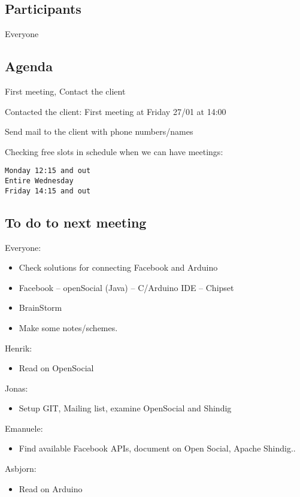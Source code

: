 \subsection{Participants}
 Everyone

\subsection{Agenda}
First meeting, Contact the client

Contacted the client: First meeting at Friday 27/01 at 14:00

Send mail to the client with phone numbers/names

Checking free slots in schedule when we can have meetings:

\begin{verbatim}
Monday 12:15 and out
Entire Wednesday
Friday 14:15 and out
\end{verbatim}

\subsection{To do to next meeting}

Everyone:
\begin{itemize}
\item Check solutions for connecting Facebook and Arduino
\item Facebook -- openSocial (Java) -- C/Arduino IDE -- Chipset
\item BrainStorm
\item Make some notes/schemes.
\end{itemize}

Henrik:
\begin{itemize}
\item Read on OpenSocial
\end{itemize}

Jonas:
\begin{itemize}
\item Setup GIT, Mailing list, examine OpenSocial and Shindig
\end{itemize}

Emanuele:
\begin{itemize}
\item Find available Facebook APIs, document on Open Social, Apache Shindig..
\end{itemize}

Asbjorn:
\begin{itemize}
\item Read on Arduino
\end{itemize}

